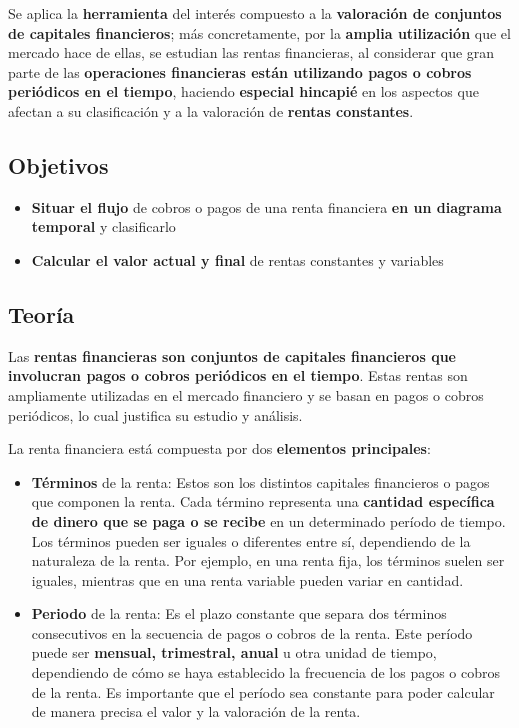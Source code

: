\documentclass[
  letterpaper,
  DIV=11,
  numbers=noendperiod]{scrreprt}
\begin{document}
\begin{tcolorbox}
Se aplica la \textbf{herramienta} del interés compuesto a la
\textbf{valoración de conjuntos de capitales financieros}; más
concretamente, por la \textbf{amplia utilización} que el mercado hace de
ellas, se estudian las rentas financieras, al considerar que gran parte
de las \textbf{operaciones financieras están utilizando pagos o cobros
periódicos en el tiempo}, haciendo \textbf{especial hincapié} en los
aspectos que afectan a su clasificación y a la valoración de
\textbf{rentas constantes}.

\subsection{Objetivos}\label{objetivos}

\begin{itemize}
\item
  \textbf{Situar el flujo} de cobros o pagos de una renta financiera
  \textbf{en un diagrama temporal} y clasificarlo
\item
  \textbf{Calcular el valor actual y final} de rentas constantes y
  variables
\end{itemize}

\subsection{Teoría}\label{teoruxeda}

Las \textbf{rentas financieras son conjuntos de capitales financieros
que involucran pagos o cobros periódicos en el tiempo}. Estas rentas son
ampliamente utilizadas en el mercado financiero y se basan en pagos o
cobros periódicos, lo cual justifica su estudio y análisis.

La renta financiera está compuesta por dos \textbf{elementos
principales}:

\begin{itemize}
\item
  \textbf{Términos} de la renta: Estos son los distintos capitales
  financieros o pagos que componen la renta. Cada término representa una
  \textbf{cantidad específica de dinero que se paga o se recibe} en un
  determinado período de tiempo. Los términos pueden ser iguales o
  diferentes entre sí, dependiendo de la naturaleza de la renta. Por
  ejemplo, en una renta fija, los términos suelen ser iguales, mientras
  que en una renta variable pueden variar en cantidad.
\item
  \textbf{Periodo} de la renta: Es el plazo constante que separa dos
  términos consecutivos en la secuencia de pagos o cobros de la renta.
  Este período puede ser \textbf{mensual, trimestral, anual} u otra
  unidad de tiempo, dependiendo de cómo se haya establecido la
  frecuencia de los pagos o cobros de la renta. Es importante que el
  período sea constante para poder calcular de manera precisa el valor y
  la valoración de la renta.
\end{itemize}


\end{tcolorbox}
\end{document}
